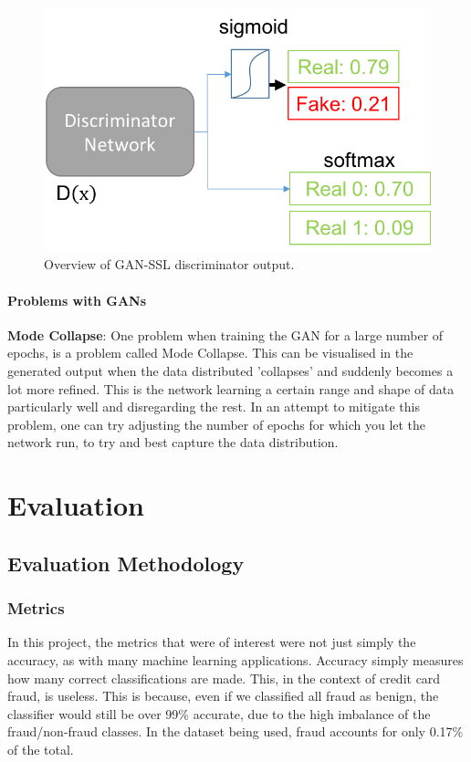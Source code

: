 \documentclass[12pt,a4paper,twoside]{report}
\begin{document}
\begin{figure}[H]
\centering
\includegraphics[scale=0.8]{gan-ssl}
\caption{Overview of GAN-SSL discriminator output.}
\label{fig:gan-ssl}
\end{figure}

\subsubsection{Problems with GANs}

\textbf{Mode Collapse}: One problem when training the GAN for a large number of epochs, is a problem called Mode Collapse. This can be visualised in the generated output when the data distributed 'collapses' and suddenly becomes a lot more refined. This is the network learning a certain range and shape of data particularly well and disregarding the rest. In an attempt to mitigate this problem, one can try adjusting the number of epochs for which you let the network run, to try and best capture the data distribution. 


\chapter{Evaluation}
\section{Evaluation Methodology}
\subsection{Metrics}
In this project, the metrics that were of interest were not just simply the accuracy, as with many machine learning applications. Accuracy simply measures how many correct classifications are made. This, in the context of credit card fraud, is useless. This is because, even if we classified all fraud as benign, the classifier would still be over 99\% accurate, due to the high imbalance of the fraud/non-fraud classes. In the dataset being used, fraud accounts for only 0.17\% of the total. 
\end{document}

